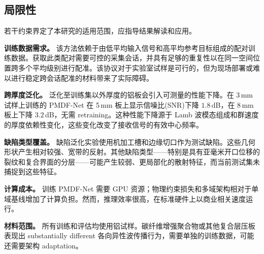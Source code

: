 \subsection{局限性}
\label{sec:discussion-limitations}

若干约束界定了本研究的适用范围，应指导结果解读和应用。

\textbf{训练数据需求。} 该方法依赖于由低平均输入信号和高平均参考目标组成的配对训练数据。获取此类配对需要可控的采集会话，并具有足够的重复性以在同一空间位置跨多个平均级别进行配准。该协议对于实验室试样是可行的，但为现场部署或难以进行稳定跨会话配准的材料带来了实际障碍。

\textbf{跨厚度泛化。} 泛化至训练集以外厚度的铝板会引入可测量的性能下降。在 3\,mm 试样上训练的 PMDF-Net 在 5\,mm 板上显示信噪比(SNR)下降 $1.8$\,dB，在 8\,mm 板上下降 $3.2$\,dB，无需 retraining。这种性能下降源于 Lamb 波模态组成和群速度的厚度依赖性变化，这些变化改变了接收信号的有效中心频率。

\textbf{缺陷类型覆盖。} 缺陷泛化实验使用机加工槽和边缘切口作为测试缺陷。这些几何形状产生相对较强、宽带的反射。其他缺陷类型——特别是具有亚毫米开口位移的裂纹和复合界面的分层——可能产生较弱、更局部化的散射特征，而当前测试集未捕捉到这些特征。

\textbf{计算成本。} 训练 PMDF-Net 需要 GPU 资源；物理约束损失和多域架构相对于单域基线增加了计算负担。然而，推理效率很高，在标准硬件上以商业相关速度运行。

\textbf{材料范围。} 所有训练和评估均使用铝试样。碳纤维增强聚合物或其他复合层压板表现出 substantially different 各向异性波传播行为，需要单独的训练数据，可能还需要架构 adaptation。